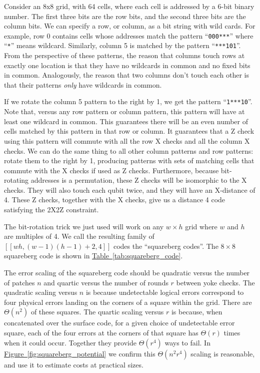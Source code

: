 \documentclass[onecolumn,unpublished,a4paper]{quantumarticle}
\theoremstyle{definition}
\theoremstyle{definition}
\theoremstyle{definition}
\newcommand{\fig}[1]{\hyperref[fig:#1]{Figure~\ref*{fig:#1}}}
\newcommand{\tab}[1]{\hyperref[tab:#1]{Table~\ref*{tab:#1}}}
\begin{document}
Consider an 8x8 grid, with 64 cells, where each cell is addressed by a 6-bit binary number.
The first three bits are the row bits, and the second three bits are the column bits.
We can specify a row, or column, as a bit string with wild cards.
For example, row 0 contains cells whose addresses match the pattern ``\texttt{000***}'' where ``\texttt{*}'' means wildcard.
Similarly, column 5 is matched by the pattern ``\texttt{***101}''.
From the perspective of these patterns, the reason that columns touch rows at exactly one location is that they have no wildcards in common and no fixed bits in common.
Analogously, the reason that two columns don't touch each other is that their patterns \emph{only} have wildcards in common.

If we rotate the column 5 pattern to the right by 1, we get the pattern ``\texttt{1***10}''.
Note that, versus any row pattern or column pattern, this pattern will have at least one wildcard in common.
This guarantees there will be an even number of cells matched by this pattern in that row or column.
It guarantees that a Z check using this pattern will commute with all the row X checks and all the column X checks.
We can do the same thing to all other column patterns and row patterns: rotate them to the right by 1, producing patterns with sets of matching cells that commute with the X checks if used as Z checks.
Furthermore, because bit-rotating addresses is a permutation, these Z checks will be isomorphic to the X checks.
They will also touch each qubit twice, and they will have an X-distance of 4.
These Z checks, together with the X checks, give us a distance 4 code satisfying the 2X2Z constraint.

The bit-rotation trick we just used will work on any $w \times h$ grid where $w$ and $h$ are multiples of 4.
We call the resulting family of $[[wh, (w-1)(h-1)+2, 4]]$ codes the ``squareberg codes''.
The $8 \times 8$ squareberg code is shown in \tab{squareberg_code}.

The error scaling of the squareberg code should be quadratic versus the number of patches $n$ and quartic versus the number of rounds $r$ between yoke checks.
The quadratic scaling versus $n$ is because undetectable logical errors correspond to four physical errors landing on the corners of a square within the grid.
There are $\Theta(n^2)$ of these squares.
The quartic scaling versus $r$ is because, when concatenated over the surface code, for a given choice of undetectable error square, each of the four errors at the corners of that square has $\Theta(r)$ times when it could occur.
Together they provide $\Theta(r^4)$ ways to fail.
In \fig{squareberg_potential} we confirm this $\Theta(n^2 r^4)$ scaling is reasonable, and use it to estimate costs at practical sizes.
\end{document}

